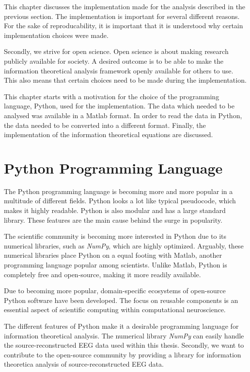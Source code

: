 This chapter discusses the implementation made for the analysis described in the previous section. The implementation is important for several different reasons. For the sake of reproducability, it is important that it is understood why certain implementation choices were made. 

Secondly, we strive for open science. Open science is about making research publicly available for society. A desired outcome is to be able to make the information theoretical analysis framework openly available for others to use. This also means that certain choices need to be made during the implementation.

This chapter starts with a motivation for the choice of the programming language, Python, used for the implementation. The data which needed to be analysed was available in a Matlab format. In order to read the data in Python, the data needed to be converted into a different format. Finally, the implementation of the information theoretical equations are discussed.

\section{Python Programming Language}

The Python programming language is becoming more and more popular in a multitude of different fields. Python looks a lot like typical pseudocode, which makes it highly readable. Python is also modular and has a large standard library. These features are the main cause behind the surge in popularity. 

The scientific community is becoming more interested in Python due to its numerical libraries, such as \textit{NumPy}, which are highly optimized. Arguably, these numerical libraries place Python on a equal footing with Matlab, another programming language popular among scientists. Unlike Matlab, Python is completely free and open-source, making it more readily available.

Due to becoming more popular, domain-specific ecosystems of open-source Python software have been developed. The focus on reusable components is an essential aspect of scientific computing within computational neuroscience. 

The different features of Python make it a desirable programming language for information theoretical analysis. The numerical library \textit{NumPy} can easily handle the source-reconstructed EEG data used within this thesis. Secondly, we want to contribute to the open-source community by providing a library for information theoretica analysis of source-reconstructed EEG data.

